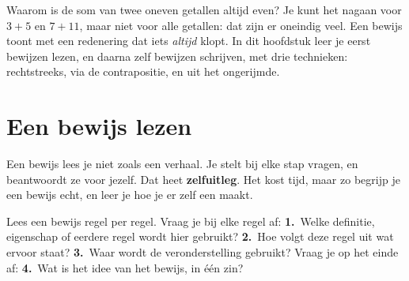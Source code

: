 %



Waarom is de som van twee oneven getallen altijd even? Je kunt het nagaan voor $3 + 5$ en $7 + 11$, maar niet voor alle getallen: dat zijn er oneindig veel. Een bewijs toont met een redenering dat iets \textit{altijd} klopt. In dit hoofdstuk leer je eerst bewijzen lezen, en daarna zelf bewijzen schrijven, met drie technieken: rechtstreeks, via de contrapositie, en uit het ongerijmde.

\begin{oefeningen}[Start]

\end{oefeningen}

\section{Een bewijs lezen}

Een bewijs lees je niet zoals een verhaal. Je stelt bij elke stap vragen, en beantwoordt ze voor jezelf. Dat heet \textbf{zelfuitleg}. Het kost tijd, maar zo begrijp je een bewijs echt, en leer je hoe je er zelf een maakt.

\begin{werkwijze}
Lees een bewijs regel per regel. Vraag je bij elke regel af: \textbf{1.}~Welke definitie, eigenschap of eerdere regel wordt hier gebruikt? \textbf{2.}~Hoe volgt deze regel uit wat ervoor staat? \textbf{3.}~Waar wordt de veronderstelling gebruikt? Vraag je op het einde af: \textbf{4.}~Wat is het idee van het bewijs, in één zin?
\end{werkwijze}

